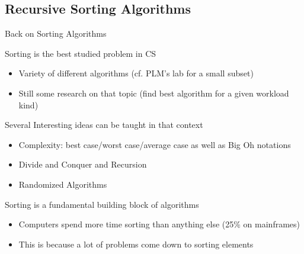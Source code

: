 \subsection{Recursive Sorting Algorithms}\sectionpage
\begin{frame}{Back on Sorting Algorithms}

  \begin{block}{Sorting is the best studied problem in CS}
    \begin{itemize}
    \item Variety of different algorithms (cf. PLM's lab for a small subset)
    \item Still some research on that topic 
      {\small (find best algorithm for a given workload kind)}
    \end{itemize}
  \end{block}

  \begin{block}{Several Interesting ideas can be taught in that context}
    \begin{itemize}
    \item Complexity: best case/worst case/average case as well as Big Oh
      notations 
    \item Divide and Conquer and Recursion
    \item Randomized Algorithms
    \end{itemize}
  \end{block}

  \begin{block}{Sorting is a fundamental building block of algorithms}
    \begin{itemize}
    \item Computers spend more time sorting than anything else
      {\small (25\% on mainframes)}

    \item This is because a lot of problems come down to sorting elements
    \end{itemize}
  \end{block}
\end{frame}
